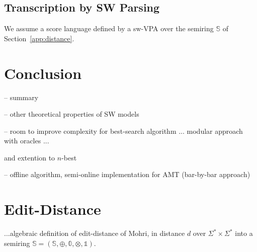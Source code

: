 \documentclass[runningheads]{llncs}
\newcommand{\Semiring}{\mathbb{S}}
\newcommand{\zero}{\mathbb{0}}
\newcommand{\one}{\mathbb{1}}
\def\SWVPA{\textsf{sw-VPA}\xspace}
\begin{document}
\subsection{Transcription by SW Parsing} %
We assume a score language defined by a \SWVPA over the semiring 
$\Semiring$ of Section~\ref{app:distance}.



\section*{Conclusion}

\noindent
-- summary 

\noindent
-- other theoretical properties of SW models

\noindent
-- room to improve complexity for best-search algorithm
... modular approach with oracles ...

and extention to $n$-best

\noindent
-- offline algorithm, 
semi-online implementation for AMT (bar-by-bar approach)





%
% 

%






\newpage
\appendix 




\section{Edit-Distance}

...algebraic definition of edit-distance of Mohri, in \cite{Mohri03EDWA}
distance $d$ over $\Sigma^* \times \Sigma^*$ 
into a semiring  $\Semiring = ( \Semiring, \oplus, \zero, \otimes, \one)$.
\end{document}
